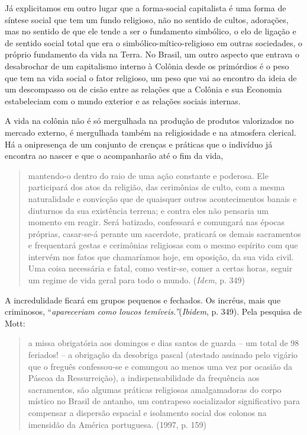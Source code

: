 Já explicitamos em outro lugar que a forma-social capitalista é uma
forma de síntese social que tem um fundo religioso, não no sentido de
cultos, adorações, mas no sentido de que ele tende a ser o fundamento
simbólico, o elo de ligação e de sentido social total que era o
simbólico-mítico-religioso em outras sociedades, o próprio fundamento da
vida na Terra. No Brasil, um outro aspecto que entrava o desabrochar de
um capitalismo interno à Colônia desde os primórdios é o peso que tem na
vida social o fator religioso, um peso que vai ao encontro da ideia de
um descompasso ou de cisão entre as relações que a Colônia e sua
Economia estabeleciam com o mundo exterior e as relações sociais
internas.

A vida na colônia não é só mergulhada na produção de produtos
valorizados no mercado externo, é mergulhada também na religiosidade e
na atmosfera clerical. Há a onipresença de um conjunto de crenças e
práticas que o indivíduo já encontra ao nascer e que o acompanharão até
o fim da vida,

\begin{quote}
mantendo-o dentro do raio de uma ação constante e poderosa. Ele
participará dos atos da religião, das cerimônias de culto, com a mesma
naturalidade e convicção que de quaisquer outros acontecimentos banais e
diuturnos da sua existência terrena; e contra eles não pensaria um
momento em reagir. Será batizado, confessará e comungará nas épocas
próprias, casar-se-á perante um sacerdote, praticará os demais
sacramentos e frequentará gestas e cerimônias religiosas com o mesmo
espírito com que intervém nos fatos que chamaríamos hoje, em oposição,
da sua vida civil. Uma coisa necessária e fatal, como vestir-se, comer a
certas horas, seguir um regime de vida geral para todo o mundo.
(\emph{Idem}, p. 349)
\end{quote}

A incredulidade ficará em grupos pequenos e fechados. Os incréus, mais
que criminosos, ``\emph{apareceriam como loucos
temíveis.''}(\emph{Ibidem}, p. 349). Pela pesquisa de Mott:

\begin{quote}
a missa obrigatória aos domingos e dias santos de guarda -- um total de
98 feriados! -- a obrigação da desobriga pascal (atestado assinado pelo
vigário que o freguês confessou-se e comungou ao menos uma vez por
ocasião da Páscoa da Ressurreição), a indispensabilidade da frequência
aos sacramentos, são algumas práticas religiosas amalgamadoras do corpo
místico no Brasil de antanho, um contrapeso socializador significativo
para compensar a dispersão espacial e isolamento social dos colonos na
imensidão da América portuguesa. (1997, p. 159)
\end{quote}

